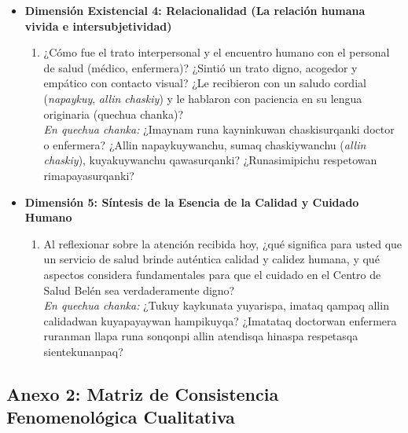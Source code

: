 \begin{itemize}
    \item \textbf{Dimensión Existencial 4: Relacionalidad (La relación humana vivida e intersubjetividad)}
    \begin{enumerate}[resume]
        \item ¿Cómo fue el trato interpersonal y el encuentro humano con el personal de salud (médico, enfermera)? ¿Sintió un trato digno, acogedor y empático con contacto visual? ¿Le recibieron con un saludo cordial (\textit{napaykuy}, \textit{allin chaskiy}) y le hablaron con paciencia en su lengua originaria (quechua chanka)?\\
        \textit{En quechua chanka:} ¿Imaynam runa kayninkuwan chaskisurqanki doctor o enfermera? ¿Allin napaykuywanchu, sumaq chaskiywanchu (\textit{allin chaskiy}), kuyakuywanchu qawasurqanki? ¿Runasimipichu respetowan rimapayasurqanki?
    \end{enumerate}

    \item \textbf{Dimensión 5: Síntesis de la Esencia de la Calidad y Cuidado Humano}
    \begin{enumerate}[resume]
        \item Al reflexionar sobre la atención recibida hoy, ¿qué significa para usted que un servicio de salud brinde auténtica calidad y calidez humana, y qué aspectos considera fundamentales para que el cuidado en el Centro de Salud Belén sea verdaderamente digno?\\
        \textit{En quechua chanka:} ¿Tukuy kaykunata yuyarispa, imataq qampaq allin calidadwan kuyapayaywan hampikuyqa? ¿Imatataq doctorwan enfermera ruranman llapa runa sonqonpi allin atendisqa hinaspa respetasqa sientekunanpaq?
    \end{enumerate}
\end{itemize}

\vspace{0.5cm}

\subsection*{Anexo 2: Matriz de Consistencia Fenomenológica Cualitativa}
\label{anx:2_matriz}

